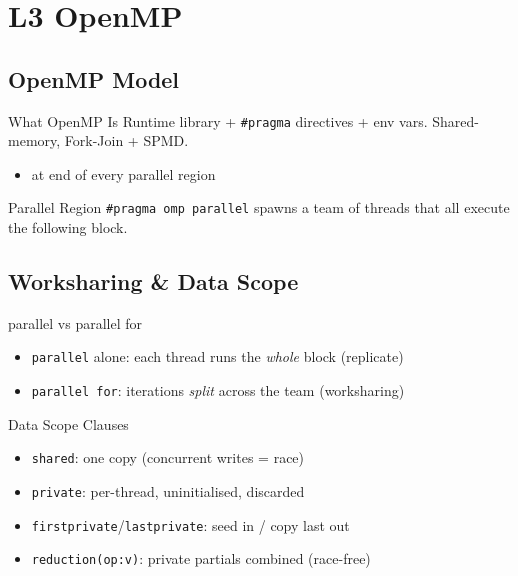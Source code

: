 \section{L3 OpenMP}

\subsection{OpenMP Model}

\begin{concept}{What OpenMP Is}
    Runtime library + \texttt{\#pragma} directives + env vars. Shared-memory, Fork-Join + SPMD.
    \begin{itemize}
        \item {} at end of every parallel region
    \end{itemize}
\end{concept}

\begin{definition}{Parallel Region}
    \texttt{\#pragma omp parallel} spawns a team of threads that all execute the following block.
\end{definition}

\subsection{Worksharing \& Data Scope}

\begin{concept}{parallel vs parallel for}
    \begin{itemize}
        \item \texttt{parallel} alone: each thread runs the \emph{whole} block (replicate)
        \item \texttt{parallel for}: iterations \emph{split} across the team (worksharing)
    \end{itemize}
\end{concept}

\begin{definition}{Data Scope Clauses}
    \begin{itemize}
        \item \texttt{shared}: one copy (concurrent writes = race)
        \item \texttt{private}: per-thread, uninitialised, discarded
        \item \texttt{firstprivate}/\texttt{lastprivate}: seed in / copy last out
        \item \texttt{reduction(op:v)}: private partials combined (race-free)
    \end{itemize}
\end{definition}

